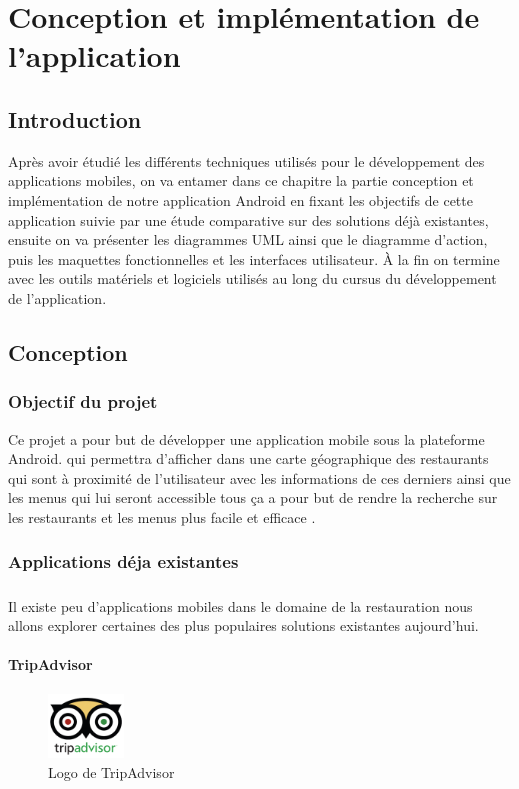 
\chapter{Conception et implémentation de l'application}
\section{Introduction}
Après avoir étudié les différents techniques utilisés pour le développement des applications mobiles, on va entamer dans ce chapitre la partie conception et implémentation de notre application Android en fixant les objectifs de cette application suivie par une étude comparative sur des solutions déjà existantes, ensuite on va présenter les diagrammes UML ainsi que le diagramme d'action, puis les maquettes fonctionnelles et les interfaces utilisateur. À la fin on termine avec les outils matériels et logiciels utilisés au long du cursus du développement de l’application.
\section{Conception}
\subsection{Objectif du projet}
Ce projet a pour but de développer une application mobile sous la plateforme Android. qui permettra d'afficher dans une carte géographique des restaurants qui sont à proximité de l'utilisateur avec les informations de ces derniers ainsi que les menus qui lui seront accessible tous ça a pour but de rendre la recherche sur les restaurants et les menus plus facile et efficace .
\subsection{Applications déja existantes}
\paragraph*{}
Il existe peu d'applications mobiles dans le domaine de la restauration nous allons explorer certaines des plus populaires solutions existantes aujourd’hui.

\newpage
\subsubsection{TripAdvisor}
\begin{figure}
    \vspace{-15pt}
    \includegraphics[width=2cm]{images/Chapitre1/tripadvisor.png}
    \vspace{-20pt}
    \caption{{\footnotesize Logo de TripAdvisor}}
\end{figure}

